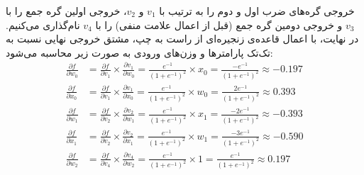 \begin{ابجد}
خروجی گره‌های ضرب اول و دوم را به ترتیب با $v_1$ و $v_2$، خروجی اولین گره جمع را با $v_3$ و خروجی دومین گره جمع (قبل از اعمال علامت منفی) را با $v_4$ نام‌گذاری می‌کنیم. در نهایت، با اعمال قاعده‌ی زنجیره‌ای از راست به چپ، مشتق خروجی نهایی نسبت به تک‌تک پارامترها و وزن‌های ورودی به صورت زیر محاسبه می‌شود:
\begin{align*}
    \frac{\partial f}{\partial w_0} & = \frac{\partial f}{\partial v_1} \times \frac{\partial v_1}{\partial w_0} = \frac{e^{-1}}{(1+e^{-1})^2} \times x_0 = \frac{-e^{-1}}{(1+e^{-1})^2} \approx -0.197  \\
    \frac{\partial f}{\partial x_0} & = \frac{\partial f}{\partial v_1} \times \frac{\partial v_1}{\partial x_0} = \frac{e^{-1}}{(1+e^{-1})^2} \times w_0 = \frac{2e^{-1}}{(1+e^{-1})^2} \approx 0.393   \\
    \frac{\partial f}{\partial w_1} & = \frac{\partial f}{\partial v_2} \times \frac{\partial v_2}{\partial w_1} = \frac{e^{-1}}{(1+e^{-1})^2} \times x_1 = \frac{-2e^{-1}}{(1+e^{-1})^2} \approx -0.393 \\
    \frac{\partial f}{\partial x_1} & = \frac{\partial f}{\partial v_2} \times \frac{\partial v_2}{\partial x_1} = \frac{e^{-1}}{(1+e^{-1})^2} \times w_1 = \frac{-3e^{-1}}{(1+e^{-1})^2} \approx -0.590 \\
    \frac{\partial f}{\partial w_2} & = \frac{\partial f}{\partial v_4} \times \frac{\partial v_4}{\partial w_2} = \frac{e^{-1}}{(1+e^{-1})^2} \times 1 = \frac{e^{-1}}{(1+e^{-1})^2} \approx 0.197
\end{align*}

\end{ابجد}